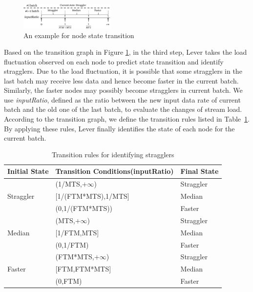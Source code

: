 \begin{figure}[htbp] \centering \includegraphics[width=0.42\textwidth]{FigureI2}
  \caption{An example for node state transition} \label{Fig. 6:}
\end{figure}

Based on the transition graph in Figure \ref{Fig. 6:}, in the third step, Lever
takes the load fluctuation observed on each node to predict state transition and
identify stragglers. Due to the load fluctuation, it is possible that some stragglers
in the last batch may receive less data and hence become faster in the current
batch. Similarly, the
faster nodes may possibly become stragglers in current batch. We 
use \emph{inputRatio}, defined as the ratio between the new input data rate of
current batch and the old one of the last batch, to evaluate the changes of
stream load. According to the transition graph, we define the transition rules
listed in Table~\ref{Table1}. By applying these rules, Lever finally identifies the state of
each node for the current batch.
  \begin{table}[htbp]
    \footnotesize
    \centering
    \caption{Transition rules for identifying stragglers}
    \begin{threeparttable}
    \centering
      \begin{tabular}{|p{1.5cm}|p{4.3cm}|p{1.4cm}|}
        \hline
        Initial State & Transition Conditions(inputRatio) & Final State \\
        \hline
        \multirow{3}{2cm}{Straggler} &
        (1/MTS,$+\infty$) & Straggler \\
        \cline{2-3}
        & [1/(FTM*MTS),1/MTS] & Median \\
        \cline{2-3}
        & (0,1/(FTM*MTS)) & Faster \\
        \hline
        \multirow{3}{2cm}{Median} &
        (MTS,$+\infty$) & Straggler \\
        \cline{2-3}
        & [1/FTM,MTS] & Median \\
        \cline{2-3}
        & (0,1/FTM) & Faster \\
        \hline
        \multirow{3}{2cm}{Faster} &
        (FTM*MTS,$+\infty$) & Straggler \\
        \cline{2-3}
        & [FTM,FTM*MTS] & Median \\
        \cline{2-3}
        & (0,FTM) & Faster \\
        \hline
      \end{tabular}
    \end{threeparttable}
    \label{Table1}
  \end{table}

